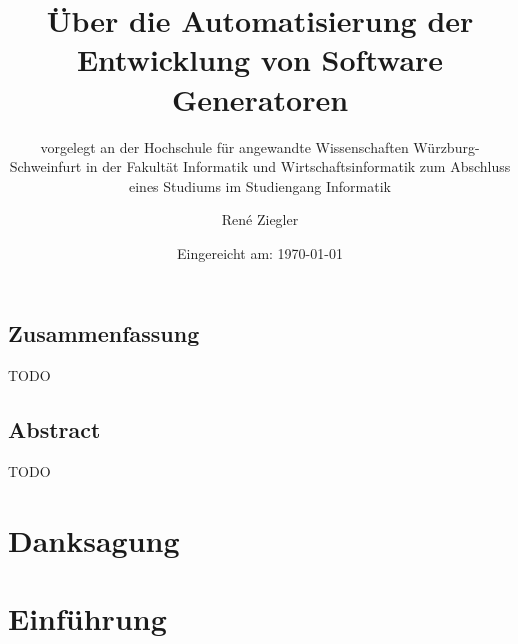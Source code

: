 \documentclass[12pt,oneside,a4paper,parskip]{scrbook}
\def\BaAuthor{René Ziegler}
\def\BaTitle{Über die Automatisierung der Entwicklung von Software Generatoren}
\def\BaSupervisorOne{Prof.\ Dr.\ Peter Braun}
\def\BaSupervisorTwo{M.Sc. Tobias Fertig}
\def\BaDeadline{\today}
\begin{document}


\frontmatter
\titlehead{%
  {Hochschule für angewandte Wissenschaften Würzburg-Schweinfurt\\
   Fakultät Informatik und Wirtschaftsinformatik}}
\subject{Bachelorarbeit}
\title{\BaTitle\\[15mm]}
\subtitle{\normalsize{vorgelegt an der Hochschule f\"{u}r angewandte Wissenschaften W\"{u}rzburg-Schweinfurt in der Fakult\"{a}t Informatik und Wirtschaftsinformatik zum Abschluss eines Studiums im Studiengang Informatik}}
\author{\BaAuthor}
\date{\normalsize{Eingereicht am: \BaDeadline}}
\publishers{
  \normalsize{Erstpr\"{u}fer: \BaSupervisorOne}\\
  \normalsize{Zweitpr\"{u}fer: \BaSupervisorTwo}\\
}


\maketitle



\section*{Zusammenfassung}

TODO

\section*{Abstract}

TODO

\newpage
\chapter*{Danksagung}



\tableofcontents



\mainmatter

\chapter{Einführung}\label{ch:intro}
\end{document}
